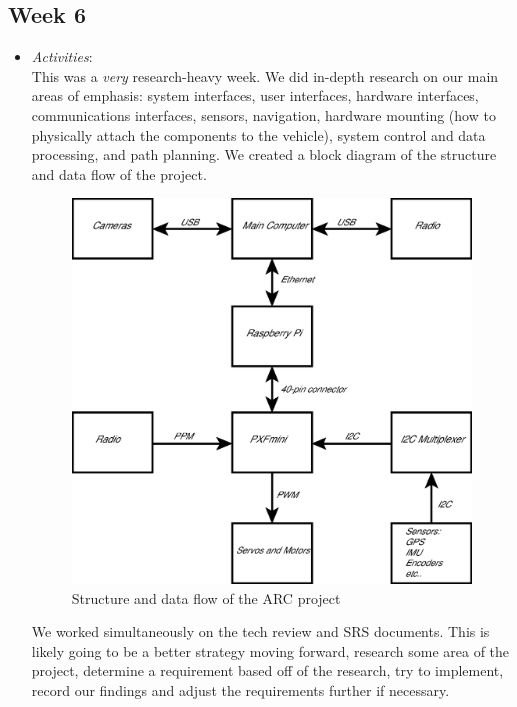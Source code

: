 \documentclass[compsoc,draftclsnofoot,onecolumn,10pt]{IEEEtran}
\begin{document}
\subsection{Week 6}
	\begin{itemize}
        \item \textit{Activities}:\\
            This was a \textit{very} research-heavy week. We did in-depth
            research on our main areas of emphasis: system interfaces, user
            interfaces, hardware interfaces, communications interfaces, sensors,
            navigation, hardware mounting (how to physically attach the
            components to the vehicle), system control and data processing, and
            path planning. We created a block diagram of the structure and data
            flow of the project.\\

           \begin{figure}[H]
              	\includegraphics[width=\textwidth]{Block_Diagram}
                \caption{Structure and data flow of the ARC project}
            \end{figure}

            We worked simultaneously on the tech review and SRS documents. This
            is likely going to be a better strategy moving forward, research
            some area of the project, determine a requirement based off of the
            research, try to implement, record our findings and adjust the
            requirements further if necessary.


\end{itemize}
\end{document}
